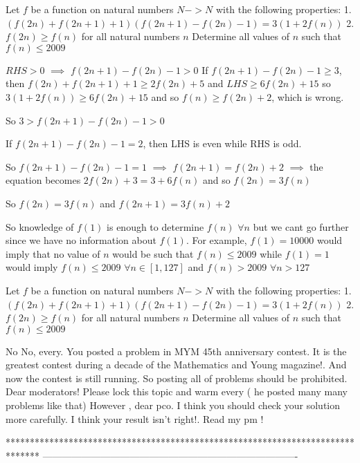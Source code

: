 \begin{solution}
	\begin{tcolorbox}Let $ f$ be a function on natural numbers $ N - > N$ with the following properties:
1.$ (f(2n) + f(2n + 1) + 1)(f(2n + 1) - f(2n) - 1) = 3(1 + 2f(n))$
2.$ f(2n)\ge f(n)$
for all natural numbers $ n$
Determine all values of $ n$ such that $ f(n)\le 2009$\end{tcolorbox}

$ RHS > 0$ $ \implies$ $ f(2n + 1) - f(2n) - 1 > 0$
If $ f(2n + 1) - f(2n) - 1\geq 3$, then $ f(2n) + f(2n + 1) + 1\geq 2f(2n) + 5$ and $ LHS\geq 6f(2n) + 15$ so $ 3(1 + 2f(n))\geq 6f(2n) + 15$ and so $ f(n)\geq f(2n) + 2$, which is wrong.

So $ 3 > f(2n + 1) - f(2n) - 1 > 0$

If $ f(2n + 1) - f(2n) - 1 = 2$, then LHS is even while RHS is odd.

So $ f(2n + 1) - f(2n) - 1 = 1$ $ \implies$ $ f(2n + 1) = f(2n) + 2$ $ \implies$ the equation becomes $ 2f(2n) + 3 = 3 + 6f(n)$ and so $ f(2n) = 3f(n)$

So $ f(2n) = 3f(n)$ and $ f(2n + 1) = 3f(n) + 2$

So knowledge of $ f(1)$ is enough to determine $ f(n)$ $ \forall n$ but we cant go further since we have no information about $ f(1)$. For example, $ f(1) = 10000$ would imply that no value of $ n$ would be such that $ f(n)\leq 2009$ while $ f(1)=1$ would imply $ f(n)\leq 2009$ $ \forall n\in[1,127]$ and $ f(n)>2009$ $ \forall n>127$
\end{solution}



\begin{solution}
	\begin{tcolorbox}Let $ f$ be a function on natural numbers $ N - > N$ with the following properties:
1.$ (f(2n) + f(2n + 1) + 1)(f(2n + 1) - f(2n) - 1) = 3(1 + 2f(n))$
2.$ f(2n)\ge f(n)$
for all natural numbers $ n$
Determine all values of $ n$ such that $ f(n)\le 2009$\end{tcolorbox}
No No, every. You posted a problem in MYM 45th anniversary contest. It is the greatest contest during  a decade of the Mathematics and Young magazine!. And now the contest is still running. So posting all of problems should be prohibited.
Dear moderators! Please lock this topic and warm every ( he posted many many problems like that)
However , dear pco. I think you should check your solution more carefully. I think your result isn't right!. Read my pm !
\end{solution}
*******************************************************************************
-------------------------------------------------------------------------------

